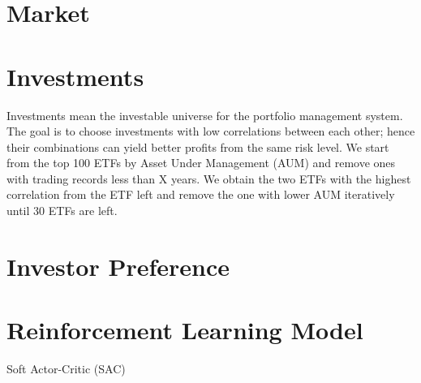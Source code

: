 \section{Market}
\section{Investments}
Investments mean the investable universe for the portfolio management system. The goal is to choose investments with low correlations between each other; hence their combinations can yield better profits from the same risk level. We start from the top 100 ETFs by Asset Under Management (AUM) and remove ones with trading records less than X years. We obtain the two ETFs with the highest correlation from the ETF left and remove the one with lower AUM iteratively until 30 ETFs are left.
\section{Investor Preference}
\section{Reinforcement Learning Model}
Soft Actor-Critic (SAC)\cite{haarnoja2018soft}